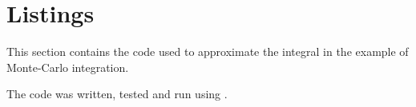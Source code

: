 \chapter{Listings}\label{app:code}
%
This section contains the  code used to approximate the integral in the example of Monte-Carlo integration. 

The code was written, tested and run using .


